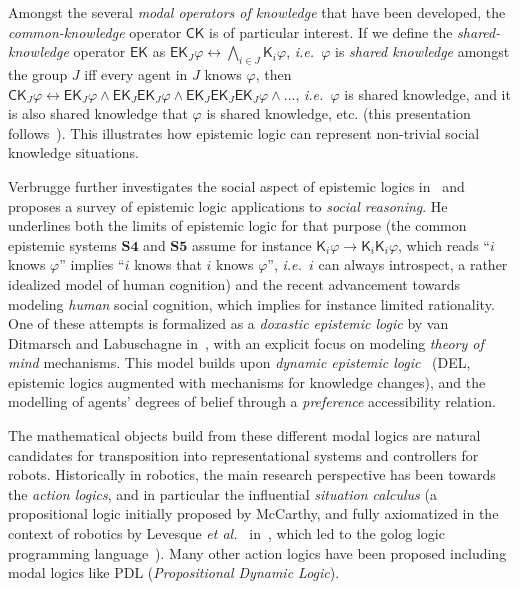 \documentclass{sig-alternate}
\newcommand{\etal}{{\textit{et al.~}}}
\newcommand{\ie}{{\textit{i.e.~}}}
\begin{document}
Amongst the several \emph{modal operators of knowledge} that have been
developed, the \emph{common-knowledge} operator $\mathsf{CK}$ is of particular
interest. If we define the \emph{shared-knowledge} operator $\mathsf{EK}$ as
$\mathsf{EK}_J\varphi \leftrightarrow \bigwedge_{i \in J}\mathsf{K}_i\varphi$,
\ie $\varphi$ is \emph{shared knowledge} amongst the group $J$ iff every agent
in $J$ knows $\varphi$, then $\mathsf{CK}_J\varphi \leftrightarrow
\mathsf{EK}_J\varphi \wedge \mathsf{EK}_J\mathsf{EK}_J\varphi \wedge
\mathsf{EK}_J\mathsf{EK}_J\mathsf{EK}_J\varphi \wedge ...$, \ie $\varphi$ is
shared knowledge, and it is also shared knowledge that $\varphi$ is shared
knowledge, etc. (this presentation follows~\cite{herzig2014logics}). This
illustrates how epistemic logic can represent non-trivial social knowledge
situations.

Verbrugge further investigates the social aspect of epistemic logics
in~\cite{verbrugge2009logic} and proposes a survey of epistemic logic
applications to \emph{social reasoning}. He underlines both the limits of
epistemic logic for that purpose (the common epistemic systems $\mathbf{S4}$ and
$\mathbf{S5}$ assume for instance $\mathsf{K}_{i}\varphi \rightarrow
\mathsf{K}_{i}\mathsf{K}_{i}\varphi$, which reads ``$i$ knows $\varphi$''
implies ``$i$ knows that $i$ knows $\varphi$'', \ie $i$ can always introspect, a
rather idealized model of human cognition) and the recent advancement towards
modeling \emph{human} social cognition, which implies for instance limited
rationality.  One of these attempts is formalized as a \emph{doxastic epistemic
logic} by van Ditmarsch and Labuschagne in~\cite{ditmarsch2007beliefs}, with an
explicit focus on modeling \emph{theory of mind} mechanisms. This model builds
upon \emph{dynamic epistemic logic}~\cite{ditmarsch2007dynamic} (DEL, epistemic
logics augmented with mechanisms for knowledge changes), and the
modelling of agents' degrees of belief through a \emph{preference} accessibility
relation.

The mathematical objects build from these different modal logics are natural
candidates for transposition into representational systems and controllers for
robots. Historically in robotics, the main research perspective has been towards
the \emph{action logics}, and in particular the influential \emph{situation
calculus} (a propositional logic initially proposed by McCarthy, and fully
axiomatized in the context of robotics by Levesque \etal
in~\cite{levesque1998foundations}, which led to the {\sc golog} logic
programming language~\cite{levesque1997golog}).  Many other action logics have
been proposed including modal logics like PDL (\emph{Propositional Dynamic
Logic}).
\end{document}
